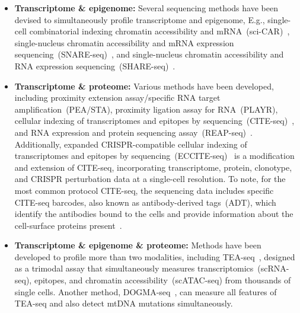 \begin{itemize}
	\item \textbf{Transcriptome \& epigenome:}
	Several sequencing methods have been devised to simultaneously profile transcriptome and epigenome, E.g., single-cell combinatorial indexing chromatin accessibility and mRNA~(sci-CAR)~\citep{cao2018scicar}, single-nucleus chromatin accessibility and mRNA expression sequencing~(SNARE-seq)~\citep{chen2019SNARE}, and single-nucleus chromatin accessibility and RNA expression sequencing~(SHARE-seq)~\citep{ma2020shareseq}.


	\item \textbf{Transcriptome \& proteome:}
	Various methods have been developed, including proximity extension assay/specific RNA target amplification~(PEA/STA), proximity ligation assay for RNA~(PLAYR), cellular indexing of transcriptomes and epitopes by sequencing~(CITE-seq)~\citep{stoeckius2017citeseq}, and RNA expression and protein sequencing assay~(REAP-seq)~\citep{peterson2017reapseq}. Additionally, expanded CRISPR-compatible cellular indexing of transcriptomes and epitopes by sequencing~(ECCITE-seq)~\citep{mimitou2019ECCITE} is a modification and extension of CITE-seq, incorporating transcriptome, protein, clonotype, and CRISPR perturbation data at a single-cell resolution. To note, for the most common protocol CITE-seq, the sequencing data includes specific CITE-seq barcodes, also known as antibody-derived tags~(ADT), which identify the antibodies bound to the cells and provide information about the cell-surface proteins present~\citep{stoeckius2017citeseq}.

	\item \textbf{Transcriptome \& epigenome \& proteome:}
	Methods have been developed to profile more than two modalities, including TEA-seq~\citep{swanson2021simultaneous}, designed as a trimodal assay that simultaneously measures transcriptomics~(scRNA-seq), epitopes, and chromatin accessibility~(scATAC-seq) from thousands of single cells. Another method, DOGMA-seq~\citep{mimitou2021scalable}, can measure all features of TEA-seq and also detect mtDNA mutations simultaneously.

\end{itemize}

